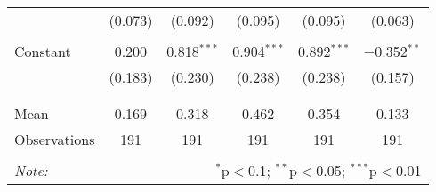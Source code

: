 \begin{tabular}{@{\extracolsep{5pt}}lccccc}
  & (0.073) & (0.092) & (0.095) & (0.095) & (0.063) \\ 
  & & & & & \\ 
 Constant & 0.200 & 0.818$^{***}$ & 0.904$^{***}$ & 0.892$^{***}$ & $-$0.352$^{**}$ \\ 
  & (0.183) & (0.230) & (0.238) & (0.238) & (0.157) \\ 
  & & & & & \\ 
\hline \\[-1.8ex] 
Mean & 0.169 & 0.318 & 0.462 & 0.354 & 0.133 \\ 
Observations & 191 & 191 & 191 & 191 & 191 \\ 
\hline 
\hline \\[-1.8ex] 
\textit{Note:}  & \multicolumn{5}{r}{$^{*}$p$<$0.1; $^{**}$p$<$0.05; $^{***}$p$<$0.01} \\ 
\end{tabular} 
